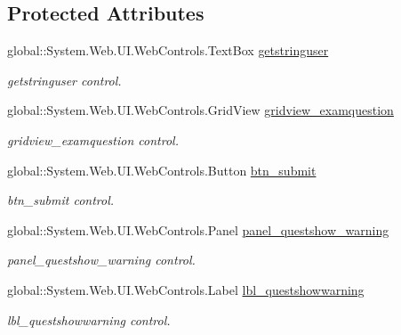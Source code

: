 \subsection*{Protected Attributes}
\begin{DoxyCompactItemize}
\item 
global\+::\+System.\+Web.\+U\+I.\+Web\+Controls.\+Text\+Box \mbox{\hyperlink{classexam_aef16f5e026d3e9953f75ab4300c14746}{getstringuser}}
\begin{DoxyCompactList}\small\item\em getstringuser control. \end{DoxyCompactList}\item 
global\+::\+System.\+Web.\+U\+I.\+Web\+Controls.\+Grid\+View \mbox{\hyperlink{classexam_a9c8a262201b7134210c2d7a6b185f227}{gridview\+\_\+examquestion}}
\begin{DoxyCompactList}\small\item\em gridview\+\_\+examquestion control. \end{DoxyCompactList}\item 
global\+::\+System.\+Web.\+U\+I.\+Web\+Controls.\+Button \mbox{\hyperlink{classexam_a90432d4b8869da31ab03a41740d7f725}{btn\+\_\+submit}}
\begin{DoxyCompactList}\small\item\em btn\+\_\+submit control. \end{DoxyCompactList}\item 
global\+::\+System.\+Web.\+U\+I.\+Web\+Controls.\+Panel \mbox{\hyperlink{classexam_a6758dd187fa3ba3c78369feb5fb94b60}{panel\+\_\+questshow\+\_\+warning}}
\begin{DoxyCompactList}\small\item\em panel\+\_\+questshow\+\_\+warning control. \end{DoxyCompactList}\item 
global\+::\+System.\+Web.\+U\+I.\+Web\+Controls.\+Label \mbox{\hyperlink{classexam_a2fa44d4bac2960721207e4407b978ac6}{lbl\+\_\+questshowwarning}}
\begin{DoxyCompactList}\small\item\em lbl\+\_\+questshowwarning control. \end{DoxyCompactList}\end{DoxyCompactItemize}
